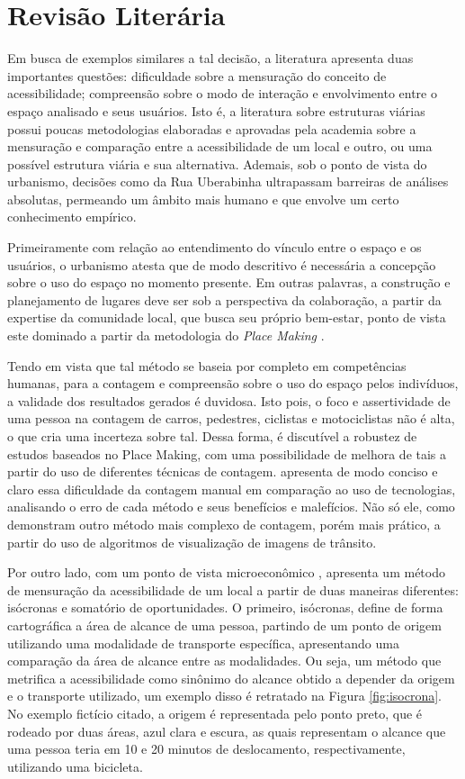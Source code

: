 \section{Revisão Literária}

Em busca de exemplos similares a tal decisão, a literatura apresenta duas importantes questões: dificuldade sobre a mensuração do conceito de acessibilidade; compreensão sobre o modo de interação e envolvimento entre o espaço analisado e seus usuários. Isto é, a literatura sobre estruturas viárias possui poucas metodologias elaboradas e aprovadas pela academia sobre a mensuração e comparação entre a acessibilidade de um local e outro, ou uma possível estrutura viária e sua alternativa. Ademais, sob o ponto de vista do urbanismo, decisões como da Rua Uberabinha ultrapassam barreiras de análises absolutas, permeando um âmbito mais humano e que envolve um certo conhecimento empírico.

Primeiramente com relação ao entendimento do vínculo entre o espaço e os usuários, o urbanismo atesta que de modo descritivo é necessária a concepção sobre o uso do espaço no momento presente. Em outras palavras, a construção e planejamento de lugares deve ser sob a perspectiva da colaboração, a partir da expertise da comunidade local, que busca seu próprio bem-estar, ponto de vista este dominado a partir da metodologia do \textit{Place Making} \textcite{Melo2024}.

Tendo em vista que tal método se baseia por completo em competências humanas, para a contagem e compreensão sobre o uso do espaço pelos indivíduos, a validade dos resultados gerados é duvidosa. Isto pois, o foco e assertividade de uma pessoa na contagem de carros, pedestres, ciclistas e motociclistas não é alta, o que cria uma incerteza sobre tal. Dessa forma, é discutível a robustez de estudos baseados no Place Making, com uma possibilidade de melhora de tais a partir do uso de diferentes técnicas de contagem. \textcite{jantsch2020} apresenta de modo conciso e claro essa dificuldade da contagem manual em comparação ao uso de tecnologias, analisando o erro de cada método e seus benefícios e malefícios. Não só ele, como \textcite{osinski2020} demonstram outro método mais complexo de contagem, porém mais prático, a partir do uso de algoritmos de visualização de imagens de trânsito.

Por outro lado, com um ponto de vista microeconômico \textcite{koenig1980}, apresenta um método de mensuração da acessibilidade de um local a partir de duas maneiras diferentes: isócronas e somatório de oportunidades. O primeiro, isócronas, define de forma cartográfica a área de alcance de uma pessoa, partindo de um ponto de origem utilizando uma modalidade de transporte específica, apresentando uma comparação da área de alcance entre as modalidades. Ou seja, um método que metrifica a acessibilidade como sinônimo do alcance obtido a depender da origem e o transporte utilizado, um exemplo disso é retratado na Figura \ref{fig:isocrona}. No exemplo fictício citado, a origem é representada pelo ponto preto, que é rodeado por duas áreas, azul clara e escura, as quais representam o alcance que uma pessoa teria em 10 e 20 minutos de deslocamento, respectivamente, utilizando uma bicicleta.

